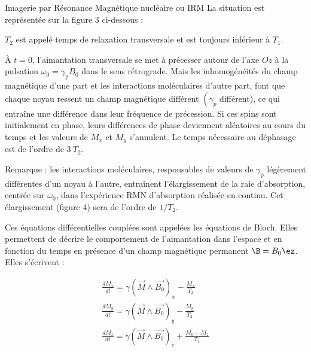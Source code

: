 \begin{exo}[PC][1][devoir]{Imagerie par Résonance Magnétique nucléaire ou IRM}
La situation est représentée sur la figure 3 ci-dessous :

\begin{fig}[label]
\centering
\end{fig}
${T}_{2}$ est appelé temps de relaxation transversale et est toujours inférieur à ${T}_{1}$.

À ${t}=0$, l'aimantation transversale se met à précesser autour de l'axe ${Oz}$ à la pulsation $\omega_{0}=\gamma_{\mathrm{p}} B_0$ dans le sens rétrograde. Mais les inhomogénéités du champ magnétique d'une part et les interactions moléculaires d'autre part, font que chaque noyau ressent un champ magnétique différent $\left(\gamma_{p}\right.$ différent), ce qui entraîne une différence dans leur fréquence de précession. Si ces spins sont initialement en phase, leurs différences de phase deviennent aléatoires au cours du temps et les valeurs de ${M}_{{x}}$ et ${M}_{{y}}$ s'annulent. Le temps nécessaire au déphasage est de l'ordre de $3 {~T}_{2}$.

Remarque : les interactions moléculaires, responsables de valeurs de $\gamma_{\mathrm{p}}$ légèrement différentes d'un noyau à l'autre, entraînent l'élargissement de la raie d'absorption, centrée sur $\omega_{0}$, dans l'expérience RMN d'absorption réalisée en continu. Cet élargissement (figure 4) sera de l'ordre de $1 / T_{2}$.

\begin{fig}[label]
\centering
\end{fig}

Ces équations différentielles couplées sont appelées les équations de Bloch. Elles permettent de décrire le comportement de l'aimantation dans l'espace et en fonction du temps en présence d'un champ magnétique permanent $\B=B_0 \ez$. Elles s'écrivent :

$$
\begin{gathered}
	\frac{d M_{x}}{d t}=\gamma\left(\vec{M} \wedge \overrightarrow{B_{0}}\right)_{x}-\frac{M_{x}}{T_{2}} \\
	\frac{d M_{y}}{d t}=\gamma\left(\vec{M} \wedge \overrightarrow{B_{0}}\right)_{y}-\frac{M_{y}}{T_{2}} \\
	\frac{d M_{z}}{d t}=\gamma\left(\vec{M} \wedge \overrightarrow{B_{0}}\right)_{z}+\frac{M_{0}-M_{z}}{T_{1}}
\end{gathered}
$$


\end{exo}
